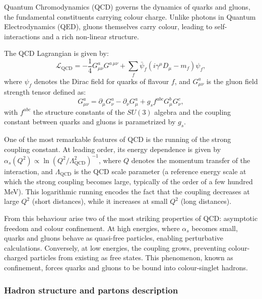 Quantum Chromodynamics (QCD) governs the dynamics of quarks and gluons, the fundamental constituents carrying colour charge. Unlike photons in Quantum Electrodynamics (QED), gluons themselves carry colour, leading to self-interactions and a rich non-linear structure.

The QCD Lagrangian is given by:
\begin{equation}
\mathcal{L}_{\mathrm{QCD}} = -\frac{1}{4} G^{a}_{\mu\nu} G^{a\,\mu\nu} + \sum_{f} \bar{\psi}_f \left( i \gamma^\mu D_\mu - m_f \right) \psi_f,
\end{equation}
where \(\psi_f\) denotes the Dirac field for quarks of flavour \(f\), and \(G^a_{\mu\nu}\) is the gluon field strength tensor defined as:
\begin{equation}
G^a_{\mu\nu} = \partial_\mu G^a_\nu - \partial_\nu G^a_\mu + g_s f^{abc} G^b_\mu G^c_\nu,
\end{equation}
with \(f^{abc}\) the structure constants of the \(SU(3)\) algebra and the coupling constant between quarks and gluons is parametrized by \(g_s\).

One of the most remarkable features of QCD is the running of the strong coupling constant. At leading order, its energy dependence is given by $\alpha_s(Q^2) \propto \ln\!\left({Q^2}/{\Lambda_{\mathrm{QCD}}^2}\right)^{-1}$,
where \(Q\) denotes the momentum transfer of the interaction, and \(\Lambda_{\mathrm{QCD}}\) is the QCD scale parameter (a reference energy scale at which the strong coupling becomes large, typically of the order of a few hundred MeV). This logarithmic running encodes the fact that the coupling decreases at large \(Q^2\) (short distances), while it increases at small \(Q^2\) (long distances).  

From this behaviour arise two of the most striking properties of QCD: asymptotic freedom and colour confinement. At high energies, where \(\alpha_s\) becomes small, quarks and gluons behave as quasi-free particles, enabling perturbative calculations. Conversely, at low energies, the coupling grows, preventing colour-charged particles from existing as free states. This phenomenon, known as confinement, forces quarks and gluons to be bound into colour-singlet hadrons.

\subsubsection*{Hadron structure and partons description}
\label{subsec:proton}

